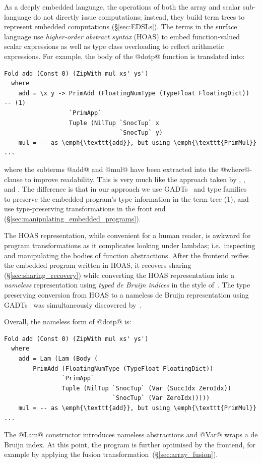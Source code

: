 As a deeply embedded language, the operations of both the array and scalar
sub-language do not directly issue computations; instead, they build term trees
to represent embedded computations (\S\ref{sec:EDSLs}). The terms in the surface
language use \emph{higher-order abstract syntax} (HOAS\HOAS{}) to embed
function-valued scalar expressions as well as type class overloading to reflect
arithmetic expressions. For example, the body of the @dotp@ function
is translated into:
%
\begin{lstlisting}[style=haskell]
Fold add (Const 0) (ZipWith mul xs' ys')
  where
    add = \x y -> PrimAdd (FloatingNumType (TypeFloat FloatingDict))               -- (1)
                  `PrimApp`
                  Tuple (NilTup `SnocTup` x
                                `SnocTup` y)
    mul = -- as \emph{\texttt{add}}, but using \emph{\texttt{PrimMul}} ...
\end{lstlisting}
%
where the subterms @add@ and @mul@ have been extracted into the @where@-clause
to improve readability. This is very much like the approach taken by
\citet{Elliott:2004hh}, \citet{Gill:2011wy}, and \citet{Mainland:2010vj}. The
difference is that in our approach we use GADTs~\cite{Jones:2006eh} and type
families~\cite{Chakravarty:2005dx,Schrijvers:2008ir} to preserve the embedded
program's type information in the term tree (1), and use type-preserving
transformations in the front end (\S\ref{sec:manipulating_embedded_programs}).

The HOAS\HOAS{} representation, while convenient for a human reader, is awkward
for program transformations as it complicates looking under lambdas;
i.e.\ inspecting and manipulating the bodies of function abstractions. After the
frontend reifies the embedded program written in HOAS, it recovers sharing
(\S\ref{sec:sharing_recovery}) while converting the HOAS representation into a
\emph{nameless} representation using \emph{typed de Bruijn indices} in the style of~\citet{Altenkirch:2003kz}. The type preserving
conversion from HOAS to a nameless de Bruijn representation using
GADTs~\cite{Chakravarty:2009uo} was simultaneously discovered
by~\citet{Atkey:2009dj}.

Overall, the nameless form of @dotp@ is:
%
\begin{lstlisting}[style=haskell]
Fold add (Const 0) (ZipWith mul xs' ys')
  where
    add = Lam (Lam (Body (
        PrimAdd (FloatingNumType (TypeFloat FloatingDict))
                `PrimApp`
                Tuple (NilTup `SnocTup` (Var (SuccIdx ZeroIdx))
                              `SnocTup` (Var ZeroIdx)))))
    mul = -- as \emph{\texttt{add}}, but using \emph{\texttt{PrimMul}} ...
\end{lstlisting}
%
The @Lam@ constructor introduces nameless abstractions and @Var@ wraps a de
Bruijn index. At this point, the program is further optimised by the frontend,
for example by applying the fusion transformation~(\S\ref{sec:array_fusion}).

